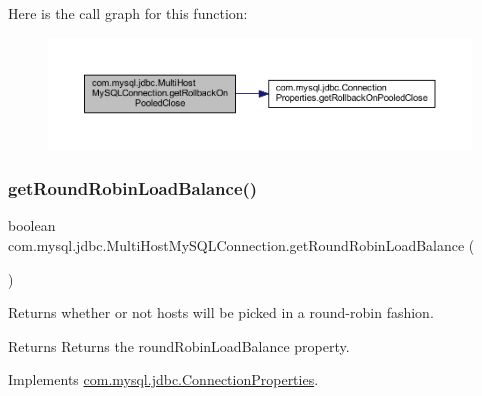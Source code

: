 Here is the call graph for this function\+:
\nopagebreak
\begin{figure}[H]
\begin{center}
\leavevmode
\includegraphics[width=350pt]{classcom_1_1mysql_1_1jdbc_1_1_multi_host_my_s_q_l_connection_a6e4539fdcc9a9aaa023d2902f1fbb1ef_cgraph}
\end{center}
\end{figure}
\mbox{\label{classcom_1_1mysql_1_1jdbc_1_1_multi_host_my_s_q_l_connection_a262fd54d367adf5972243b82981778ad}} 
\subsubsection{\texorpdfstring{get\+Round\+Robin\+Load\+Balance()}{getRoundRobinLoadBalance()}}
{\footnotesize\ttfamily boolean com.\+mysql.\+jdbc.\+Multi\+Host\+My\+S\+Q\+L\+Connection.\+get\+Round\+Robin\+Load\+Balance (\begin{DoxyParamCaption}{ }\end{DoxyParamCaption})}

Returns whether or not hosts will be picked in a round-\/robin fashion.

\begin{DoxyReturn}{Returns}
Returns the round\+Robin\+Load\+Balance property. 
\end{DoxyReturn}


Implements \mbox{\hyperlink{interfacecom_1_1mysql_1_1jdbc_1_1_connection_properties_a48b88c077dbb42077a1fb257aab4558f}{com.\+mysql.\+jdbc.\+Connection\+Properties}}.

